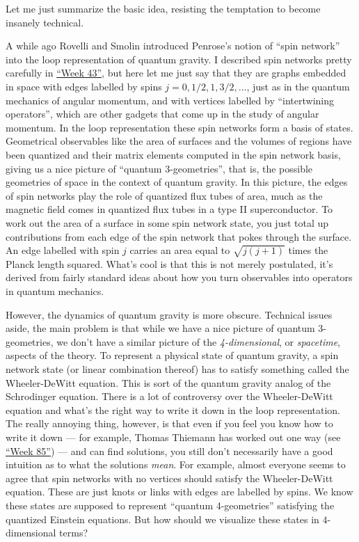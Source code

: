 \documentclass{article}
\begin{document}
Let me just summarize the basic idea, resisting the temptation to become
insanely technical.

A while ago Rovelli and Smolin introduced Penrose's notion of ``spin
network'' into the loop representation of quantum gravity. I described
spin networks pretty carefully in \protect\hyperlink{week43}{``Week
43''}, but here let me just say that they are graphs embedded in space
with edges labelled by spins \(j = 0, 1/2, 1, 3/2,\ldots\), just as in
the quantum mechanics of angular momentum, and with vertices labelled by
``intertwining operators'', which are other gadgets that come up in the
study of angular momentum. In the loop representation these spin
networks form a basis of states. Geometrical observables like the area
of surfaces and the volumes of regions have been quantized and their
matrix elements computed in the spin network basis, giving us a nice
picture of ``quantum 3-geometries'', that is, the possible geometries of
space in the context of quantum gravity. In this picture, the edges of
spin networks play the role of quantized flux tubes of area, much as the
magnetic field comes in quantized flux tubes in a type II
superconductor. To work out the area of a surface in some spin network
state, you just total up contributions from each edge of the spin
network that pokes through the surface. An edge labelled with spin \(j\)
carries an area equal to \(\sqrt{j(j+1)}\) times the Planck length
squared. What's cool is that this is not merely postulated, it's derived
from fairly standard ideas about how you turn observables into operators
in quantum mechanics.

However, the dynamics of quantum gravity is more obscure. Technical
issues aside, the main problem is that while we have a nice picture of
quantum 3-geometries, we don't have a similar picture of the
\emph{4-dimensional}, or \emph{spacetime}, aspects of the theory. To
represent a physical state of quantum gravity, a spin network state (or
linear combination thereof) has to satisfy something called the
Wheeler-DeWitt equation. This is sort of the quantum gravity analog of
the Schrodinger equation. There is a lot of controversy over the
Wheeler-DeWitt equation and what's the right way to write it down in the
loop representation. The really annoying thing, however, is that even if
you feel you know how to write it down --- for example, Thomas Thiemann
has worked out one way (see \protect\hyperlink{week85}{``Week 85''}) ---
and can find solutions, you still don't necessarily have a good
intuition as to what the solutions \emph{mean}. For example, almost
everyone seems to agree that spin networks with no vertices should
satisfy the Wheeler-DeWitt equation. These are just knots or links with
edges are labelled by spins. We know these states are supposed to
represent ``quantum 4-geometries'' satisfying the quantized Einstein
equations. But how should we visualize these states in \(4\)-dimensional
terms?
\end{document}
